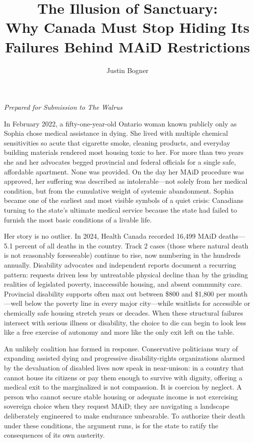 \documentclass[11pt, letterpaper]{article}
\title{\textbf{The Illusion of Sanctuary:\\Why Canada Must Stop Hiding Its Failures Behind MAiD Restrictions}}
\author{Justin Bogner}
\date{}
\begin{document}
\maketitle

\vspace{-2em}
\begin{center}
\textit{Prepared for Submission to The Walrus}
\end{center}
\vspace{2em}

In February 2022, a fifty-one-year-old Ontario woman known publicly only as Sophia chose medical assistance in dying. She lived with multiple chemical sensitivities so acute that cigarette smoke, cleaning products, and everyday building materials rendered most housing toxic to her. For more than two years she and her advocates begged provincial and federal officials for a single safe, affordable apartment. None was provided. On the day her MAiD procedure was approved, her suffering was described as intolerable---not solely from her medical condition, but from the cumulative weight of systemic abandonment. Sophia became one of the earliest and most visible symbols of a quiet crisis: Canadians turning to the state's ultimate medical service because the state had failed to furnish the most basic conditions of a livable life.

Her story is no outlier. In 2024, Health Canada recorded 16,499 MAiD deaths---5.1 percent of all deaths in the country. Track 2 cases (those where natural death is not reasonably foreseeable) continue to rise, now numbering in the hundreds annually. Disability advocates and independent reports document a recurring pattern: requests driven less by untreatable physical decline than by the grinding realities of legislated poverty, inaccessible housing, and absent community care. Provincial disability supports often max out between \$800 and \$1,800 per month---well below the poverty line in every major city---while waitlists for accessible or chemically safe housing stretch years or decades. When these structural failures intersect with serious illness or disability, the choice to die can begin to look less like a free exercise of autonomy and more like the only exit left on the table.

An unlikely coalition has formed in response. Conservative politicians wary of expanding assisted dying and progressive disability-rights organizations alarmed by the devaluation of disabled lives now speak in near-unison: in a country that cannot house its citizens or pay them enough to survive with dignity, offering a medical exit to the marginalized is not compassion. It is coercion by neglect. A person who cannot secure stable housing or adequate income is not exercising sovereign choice when they request MAiD; they are navigating a landscape deliberately engineered to make endurance unbearable. To authorize their death under these conditions, the argument runs, is for the state to ratify the consequences of its own austerity.
\end{document}
